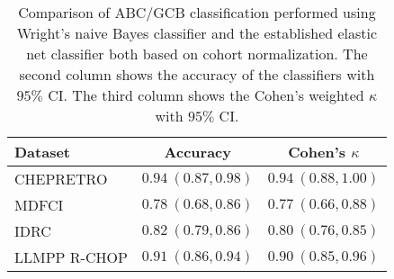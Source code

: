\begin{table}[!tbp]
{\small
\caption{Comparison of ABC/GCB classification performed using Wright's naive
Bayes classifier \citep{Wright2003} and the established elastic net classifier
both based on cohort normalization.
The second column shows the accuracy of the
classifiers with $95\%$ CI. The third column shows the Cohen's weighted
$\kappa$ with $95\%$ CI.\label{tab:ABCGCBclassifier}} 
\begin{center}
\begin{tabular}{lll}
\hline\hline
\multicolumn{1}{l}{Dataset}&\multicolumn{1}{c}{Accuracy}&\multicolumn{1}{c}{Cohen's $\kappa$}\tabularnewline
\hline
CHEPRETRO&$0.94~(0.87, 0.98)$&$0.94~(0.88, 1.00)$\tabularnewline
MDFCI&$0.78~(0.68, 0.86)$&$0.77~(0.66, 0.88)$\tabularnewline
IDRC&$0.82~(0.79, 0.86)$&$0.80~(0.76, 0.85)$\tabularnewline
LLMPP R-CHOP&$0.91~(0.86, 0.94)$&$0.90~(0.85, 0.96)$\tabularnewline
\hline
\end{tabular}\end{center}}

\end{table}

